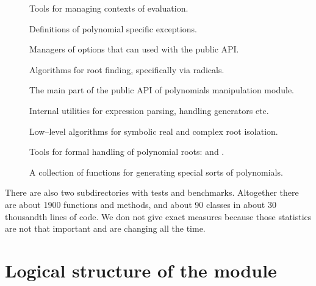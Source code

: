 \begin{description}
\item[] \leavevmode
Tools for managing contexts of evaluation.

\item[] \leavevmode
Definitions of polynomial specific exceptions.

\item[] \leavevmode
Managers of options that can used with the public API.

\item[] \leavevmode
Algorithms for root finding, specifically via radicals.

\item[] \leavevmode
The main part of the public API of polynomials manipulation module.

\item[] \leavevmode
Internal utilities for expression parsing, handling generators etc.

\item[] \leavevmode
Low--level algorithms for symbolic real and complex root isolation.

\item[] \leavevmode
Tools for formal handling of polynomial roots:  and .

\item[] \leavevmode
A collection of functions for generating special sorts of polynomials.

\end{description}

There are also two subdirectories with tests and benchmarks. Altogether there are about 1900
functions and methods, and about 90 classes in about 30 thousandth lines of code. We don not
give exact measures because those statistics are not that important and are changing all the
time.


\section{Logical structure of the module}

